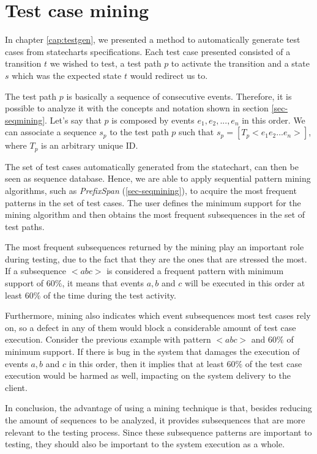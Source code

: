\section{Test case mining}
\label{sec-testsequence}

In chapter \ref{cap:testgen}, we presented a method to automatically generate test cases from statecharts specifications. Each test case presented consisted of a transition $t$ we wished to test, a test path $p$ to activate the transition and a state $s$ which was the expected state $t$ would redirect us to.

The test path $p$ is basically a sequence of consecutive events. Therefore, it is possible to analyze it with the concepts and notation shown in section \ref{sec-seqmining}. Let's say that $p$ is composed by events $e_1,e_2,...,e_n$ in this order. We can associate a sequence $s_p$ to the test path $p$ such that $s_p = [T_p < e_1e_2...e_n >]$, where $T_p$ is an arbitrary unique ID.


The set of test cases automatically generated from the statechart, can then be seen as sequence database. Hence, we are able to apply sequential pattern mining algorithms, such as \textit{PrefixSpan} (\ref{sec-seqmining}), to acquire the most frequent patterns in the set of test cases. The user defines the minimum support for the mining algorithm and then obtains the most frequent subsequences in the set of test paths.

The most frequent subsequences returned by the mining play an important role during testing, due to the fact that they are the ones that are stressed the most. If a subsequence $< a b c >$ is considered a frequent pattern with minimum support of $60\%$, it means that events $a, b$ and $c$ will be executed in this order at least $60\%$ of the time during the test activity.

Furthermore, mining also indicates which event subsequences most test cases rely on, so a defect in any of them would block a considerable amount of test case execution. Consider the previous example with pattern $< a b c >$ and $60\%$ of minimum support. If there is bug in the system that damages the execution of events $a, b$ and $c$ in this order, then it implies that at least $60\%$ of the test case execution would be harmed as well, impacting on the system delivery to the client.

In conclusion, the advantage of using a mining technique is that, besides reducing the amount of sequences to be analyzed, it provides subsequences that are more relevant to the testing process. Since these subsequence patterns are important to testing, they should also be important to the system execution as a whole. 




